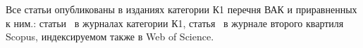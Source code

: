 {\begin{refsection}
        \nocite{dorin2024forecasting}
        \nocite{dorin2025enhancing}
        \nocite{dorin2026decoding}
        \nocite{dorin2025mmro}
        \nocite{dorin2024conf66mipt}
        \nocite{dorin2025conf67mipt}
        \nocite{dorin2026conf68mipt}
        \nocite{dorin2026ioi}
    \end{refsection}%
    Все статьи опубликованы в изданиях категории К1 перечня ВАК и приравненных к ним\ifsynopsis.\else: статьи~\cite{dorin2025enhancing, dorin2026decoding} в журналах категории К1, статья~\cite{dorin2024forecasting} в журнале второго квартиля Scopus, индексируемом также в Web of Science.\fi
}
